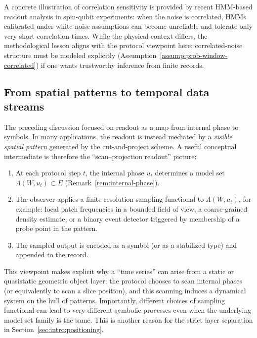 \begin{remark}\label{rem:hmm-fragility}
A concrete illustration of correlation sensitivity is provided by recent HMM-based readout analysis in spin-qubit experiments: when the noise is correlated, HMMs calibrated under white-noise assumptions can become unreliable and tolerate only very short correlation times.\cite{SpethmannStanoLoss2025SpinQubitHMM} While the physical context differs, the methodological lesson aligns with the protocol viewpoint here: correlated-noise structure must be modeled explicitly (Assumption~\ref{assump:prob-window-correlated}) if one wants trustworthy inference from finite records.
\end{remark}

\subsection{From spatial patterns to temporal data streams}\label{sec:readout:spacetime-readout}

The preceding discussion focused on readout as a map from internal phase to symbols. In many applications, the readout is instead mediated by a \emph{visible spatial pattern} generated by the cut-and-project scheme. A useful conceptual intermediate is therefore the ``scan--projection readout'' picture:
\begin{enumerate}[label=(\roman*),leftmargin=*,itemsep=2pt]
  \item At each protocol step $t$, the internal phase $u_t$ determines a model set $\Lambda(W,u_t)\subset E$ (Remark~\ref{rem:internal-phase}).
  \item The observer applies a finite-resolution sampling functional to $\Lambda(W,u_t)$, for example: local patch frequencies in a bounded field of view, a coarse-grained density estimate, or a binary event detector triggered by membership of a probe point in the pattern.
  \item The sampled output is encoded as a symbol (or as a stabilized type) and appended to the record.
\end{enumerate}

This viewpoint makes explicit why a ``time series'' can arise from a static or quasistatic geometric object layer: the protocol chooses to scan internal phases (or equivalently to scan a slice position), and this scanning induces a dynamical system on the hull of patterns. Importantly, different choices of sampling functional can lead to very different symbolic processes even when the underlying model set family is the same. This is another reason for the strict layer separation in Section~\ref{sec:intro:positioning}.

